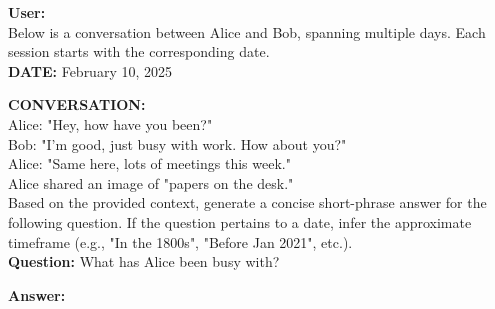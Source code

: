 \begin{tcolorbox}[colback=userbg, colframe=black, sharp corners]  
\textbf{User:} \\  
Below is a conversation between Alice and Bob, spanning multiple days. Each session starts with the corresponding date. \\  

\textbf{DATE:} February 10, 2025  

\textbf{CONVERSATION:}  \\  
Alice: "Hey, how have you been?"  \\  
Bob: "I'm good, just busy with work. How about you?"  \\  
Alice: "Same here, lots of meetings this week." \\  
Alice shared an image of "papers on the desk." \\  

Based on the provided context, generate a concise short-phrase answer for the following question.  
If the question pertains to a date, infer the approximate timeframe (e.g., "In the 1800s", "Before Jan 2021", etc.). \\  

\textbf{Question:} What has Alice been busy with?  

\textbf{Answer:}  
\end{tcolorbox}  

